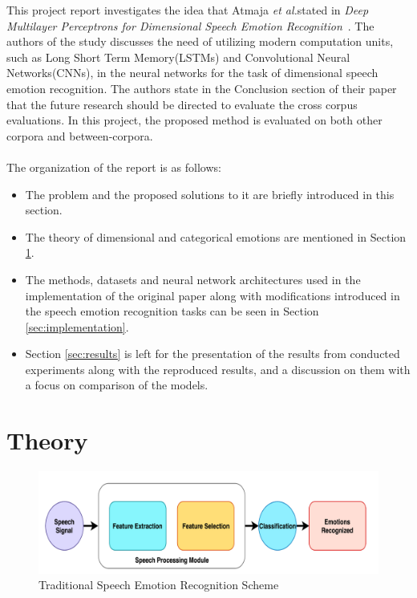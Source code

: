 \documentclass[a4paper,11pt]{article}
\begin{document}
This project report investigates the idea that Atmaja \textit{et al.}stated in \textit{Deep Multilayer Perceptrons for Dimensional Speech Emotion Recognition}~\cite{atmaja2020deep}. The authors of the study discusses the need of utilizing modern computation units, such as Long Short Term Memory(LSTMs) and Convolutional Neural Networks(CNNs), in the neural networks for the task of dimensional speech emotion recognition. The authors state in the Conclusion section of their paper that the future research should be directed to evaluate the cross corpus evaluations. In this project, the proposed method is evaluated on both other corpora and between-corpora. 
\\
\\
The organization of the report is as follows:
\begin{itemize}
    \item The problem and the proposed solutions to it are briefly introduced in this section.
    \item The theory of dimensional and categorical emotions are mentioned in Section \ref{sec:theory}.
    \item The methods, datasets and neural network architectures used in the implementation of the original paper along with modifications introduced in the speech emotion recognition tasks can be seen in Section \ref{sec:implementation}.
    \item Section \ref{sec:results} is left for the presentation of the results from conducted experiments along with the reproduced results, and a discussion on them with a focus on comparison of the models.   
\end{itemize}



\section{Theory} \label{sec:theory}

\begin{figure}[h]
    \centering
    \includegraphics[width=1\textwidth]{chart.png}
    \caption{Traditional Speech Emotion Recognition Scheme \cite{ser_deep_dl}}\label{fig:traditional}
\end{figure}
\end{document}
